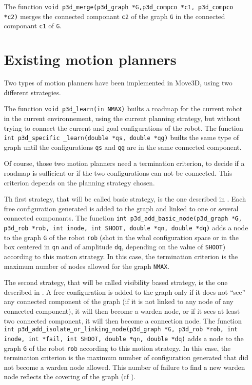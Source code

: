 The function {\tt void p3d\_merge(p3d\_graph *G,p3d\_compco *c1,
p3d\_compco *c2)}  merges the connected componant {\tt c2} of the graph
{\tt G} in the connected componant {\tt c1} of {\tt G}. 


\section{Existing motion planners}

Two types of motion planners have been implemented in Move3D, using
two different strategies. 

The function {\tt void p3d\_learn(in NMAX)}  builts a roadmap for the
current robot in the current environnement, using the current planning
strategy, but without trying to connect the current and goal
configurations of the robot. The function {\tt int
p3d\_specific \_learn(double *qs, double *qg)}
 builts the same type of
graph until the configurations {\tt qs} and {\tt qg} are in the same
connected component. 

Of course, those two motion planners need a termination criterion, to
decide if a roadmap is sufficient or if the two configurations can not
be connected. This criterion depends on the planning strategy chosen.

Th first strategy, that will be called basic strategy, is the one
described in \cite{SVET97}. Each free configuration generated is added
to the graph and linked to one or several connected componants. 
The function {\tt int p3d\_add\_basic\_node(p3d\_graph *G, p3d\_rob
*rob, int inode, int SHOOT, double *qn, double *dq)}  adds a node to
the graph {\tt G} of the robot {\tt rob} (shot in the whol
configuration space or in the box centered in {\tt qn} and of
amplitude {\tt dq}, depending on the value of {\tt SHOOT}) according to
this motion strategy. In this case, the termination criterion is the
maximum number of nodes allowed for the graph {\tt NMAX}. 

The second strategy, that will be called visibility based strategy, is
the one described in \cite{NISS99}. A free configuration is added to
the graph only if it does not ``se{e}'' any connected component of the
graph (if it is not linked to any node of any connected component), it
will then become a warden node, or if it sees at least two connected
component, it will then become a connection node. The function {\tt int
p3d\_add\_isolate\_or\_linking\_node(p3d\_graph *G, p3d\_rob *rob, int
inode, int  *fail, int SHOOT, double *qn, double *dq)}
 adds a node to
the graph {\tt G} of the robot {\tt rob} according to this motion
strategy. In this case, the termination criterion is the maximum
number of configuration generated that did not become a warden node
allowed. This number of failure to find a new warden node reflects the
covering of the graph (cf \cite{NISS99}).

